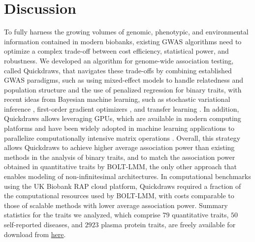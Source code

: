 \section{Discussion}

To fully harness the growing volumes of genomic, phenotypic, and environmental information contained in modern biobanks, existing GWAS algorithms need to optimize a complex trade-off between cost efficiency, statistical power, and robustness.
%
We developed an algorithm for genome-wide association testing, called Quickdraws, that navigates these trade-offs by combining established GWAS paradigms, such as using mixed-effect models \cite{yu2006unified,kang2008efficient,kang2010variance,zhang2010mixed,zhou2012genome,lippert2011fast,segura2012efficient,listgarten2012improved,listgarten2013fast,loh2015efficient,loh2018mixed,jiang2019resource} to handle relatedness and population structure and the use of penalized regression \cite{firth1993bias,mbatchou2021computationally} for binary traits, with recent ideas from Bayesian machine learning, such as stochastic variational inference \cite{graves2011practical,hoffman2013stochastic}, first-order gradient optimizers \cite{robbins1951stochastic,kingma2014adam}, and transfer learning \cite{pan2009survey}.
%
In addition, Quickdraws allows leveraging GPUs, which are available in modern computing platforms and have been widely adopted in machine learning applications to parallelize computationally intensive matrix operations \cite{paszke2017automatic}.
%
Overall, this strategy allows Quickdraws to achieve higher average association power than existing methods in the analysis of binary traits, and to match the association power obtained in quantitative traits by BOLT-LMM, the only other approach that enables modeling of non-infinitesimal architectures.
%
In computational benchmarks using the UK Biobank RAP cloud platform, Quickdraws required a fraction of the computational resources used by BOLT-LMM, with costs comparable to those of scalable methods with lower average association power. 
%
Summary statistics for the traits we analyzed, which comprise $79$ quantitative traits, $50$ self-reported diseases, and $2923$ plasma protein traits, are freely available for download from \href{https://www.stats.ox.ac.uk/publication-data/sge/ppg/quickdraws/}{here}.
%

